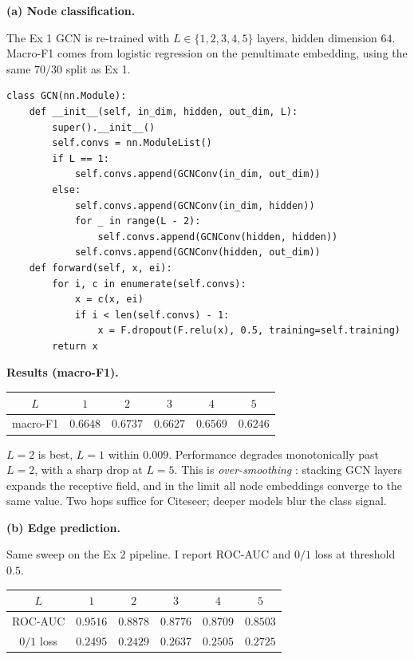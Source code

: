 \documentclass{article}
\begin{document}
\begin{tcolorbox}[colback=white, colframe=black!75, breakable, title=\textbf{Solution to Exercise 3}]
\textbf{(a) Node classification.}

The Ex 1 GCN is re-trained with $L\in\{1,2,3,4,5\}$ layers, hidden dimension $64$. Macro-F1 comes from logistic regression on the penultimate embedding, using the same $70/30$ split as Ex 1.

\begin{lstlisting}[style=python2]
class GCN(nn.Module):
    def __init__(self, in_dim, hidden, out_dim, L):
        super().__init__()
        self.convs = nn.ModuleList()
        if L == 1:
            self.convs.append(GCNConv(in_dim, out_dim))
        else:
            self.convs.append(GCNConv(in_dim, hidden))
            for _ in range(L - 2):
                self.convs.append(GCNConv(hidden, hidden))
            self.convs.append(GCNConv(hidden, out_dim))
    def forward(self, x, ei):
        for i, c in enumerate(self.convs):
            x = c(x, ei)
            if i < len(self.convs) - 1:
                x = F.dropout(F.relu(x), 0.5, training=self.training)
        return x
\end{lstlisting}

\medskip
\textbf{Results (macro-F1).}

\begin{center}
\begin{tabular}{c|ccccc}
\toprule
$L$ & $1$ & $2$ & $3$ & $4$ & $5$\\
\midrule
macro-F1 & $0.6648$ & $\mathbf{0.6737}$ & $0.6627$ & $0.6569$ & $0.6246$\\
\bottomrule
\end{tabular}
\end{center}

$L=2$ is best, $L=1$ within $0.009$. Performance degrades monotonically past $L=2$, with a sharp drop at $L=5$. This is \emph{over-smoothing} \cite{oversmoothing}: stacking GCN layers expands the receptive field, and in the limit all node embeddings converge to the same value. Two hops suffice for Citeseer; deeper models blur the class signal.

\bigskip
\textbf{(b) Edge prediction.}

Same sweep on the Ex 2 pipeline. I report ROC-AUC and $0/1$ loss at threshold $0.5$.

\begin{center}
\begin{tabular}{c|ccccc}
\toprule
$L$ & $1$ & $2$ & $3$ & $4$ & $5$\\
\midrule
ROC-AUC & $\mathbf{0.9516}$ & $0.8878$ & $0.8776$ & $0.8709$ & $0.8503$\\
$0/1$ loss & $0.2495$ & $\mathbf{0.2429}$ & $0.2637$ & $0.2505$ & $0.2725$\\
\bottomrule
\end{tabular}
\end{center}


\end{tcolorbox}
\end{document}
